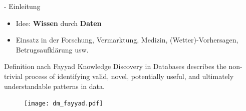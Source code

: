 \documentclass[fleqn,11pt,aspectratio=43]{beamer}
\begin{document}
\begin{frame}{\insertsectionhead - Einleitung \cite{ester2000knowledge}}
\small
\vspace{-1em}
\begin{itemize} %
\setlength{\itemsep}{-3pt}
\item Idee: \textbf{Wissen} durch \textbf{Daten}
\item Einsatz in der Forschung, Vermarktung, Medizin, (Wetter)-Vorhersagen, 
Betrugsaufklärung usw.
\end{itemize}
\vspace{-1em}
\begin{block}{Definition nach Fayyad \cite{fayyad1996data}}
Knowledge Discovery in Databases describes the non-trivial process of 
identifying valid, novel, potentially useful, and ultimately understandable 
patterns in data.
\begin{figure}
\vspace{-2.7em} \hspace{-1.5em}
\texttt{[image: dm\_fayyad.pdf]}
\label{fig:fayyad1996data}
\end{figure}
\vspace{-3.5em}
\end{block}
\end{frame}

%

%
\end{document}
